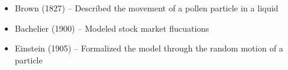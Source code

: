 \documentclass[../chapter01.tex]{subfile}
\begin{document}
\begin{itemize}
  \item Brown (1827) -- Described the movement of a pollen particle in a liquid
  \item Bachelier (1900) -- Modeled stock market flucuations
  \item Einstein (1905) -- Formalized the model through the random motion of a particle
\end{itemize}
\end{document}
